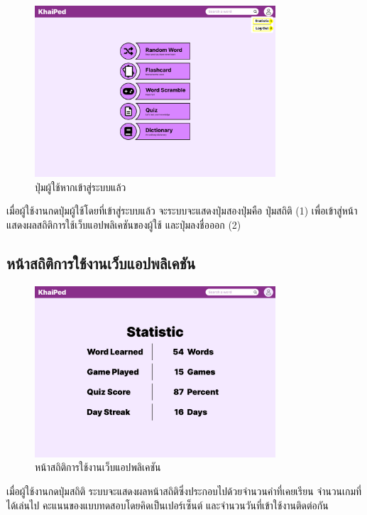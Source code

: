 \documentclass[12pt,oneside,openright,a4paper]{cpe-thai-project}
\begin{document}
\pagebreak
\begin{figure}[!h]\centering
	\includegraphics[width=0.8\textwidth, keepaspectratio=true]{image/chap3/ui/statistic/Home page - Logged In User Button.png}
	\caption{ปุ่มผู้ใช้หากเข้าสู่ระบบแล้ว}\label{fig:UI_UserButton}
\end{figure}
\hspace{1cm}
เมื่อผู้ใช้งานกดปุ่มผู้ใช้โดยที่เข้าสู่ระบบแล้ว จะระบบจะแสดงปุ่มสองปุ่มคือ ปุ่มสถิติ (1) เพื่อเข้าสู่หน้าแสดงผลสถิติการใช้เว็บแอปพลิเคชันของผู้ใช้ และปุ่มลงชื่อออก (2)

\subsection{หน้าสถิติการใช้งานเว็บแอปพลิเคชัน}
\begin{figure}[!h]\centering
	\includegraphics[width=0.8\textwidth, keepaspectratio=true]{image/chap3/ui/statistic/Statistic.png}
	\caption{หน้าสถิติการใช้งานเว็บแอปพลิเคชัน}\label{fig:UI_Statistic}
\end{figure}
\hspace{1cm}
เมื่อผู้ใช้งานกดปุ่มสถิติ ระบบจะแสดงผลหน้าสถิติซึ่งประกอบไปด้วยจำนวนคำที่เคยเรียน จำนวนเกมที่ได้เล่นไป คะแนนของแบบทดสอบโดยคิดเป็นเปอร์เซ็นต์ และจำนวนวันที่เข้าใช้งานติดต่อกัน
\end{document}
